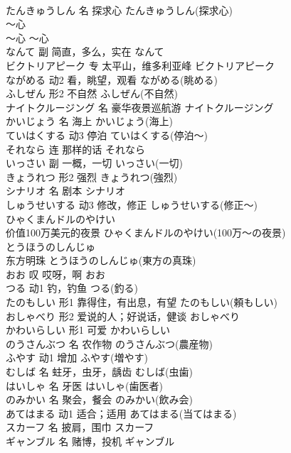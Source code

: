\documentclass[8pt]{extreport}
\begin{document}
\begin{CJK}{UTF8}{min}
\\	たんきゅうしん	名	探求心	たんきゅうしん(探求心)	
\\	～心	
\\	～心	～心	
\\	なんて	副	简直，多么，实在	なんて	
\\	ビクトリアピーク	专	太平山，维多利亚峰	ビクトリアピーク	
\\	ながめる	动2	看，眺望，观看	ながめる(眺める)	
\\	ふしぜん	形2	不自然	ふしぜん(不自然)	
\\	ナイトクルージング	名	豪华夜景巡航游	ナイトクルージング	
\\	かいじょう	名	海上	かいじょう(海上)	
\\	ていはくする	动3	停泊	ていはくする(停泊～)	
\\	それなら	连	那样的话	それなら	
\\	いっさい	副	一概，一切	いっさい(一切)	
\\	きょうれつ	形2	强烈	きょうれつ(強烈)	
\\	シナリオ	名	剧本	シナリオ	
\\	しゅうせいする	动3	修改，修正	しゅうせいする(修正～)	
\\	ひゃくまんドルのやけい	
\\	价值100万美元的夜景	ひゃくまんドルのやけい(100万～の夜景)	
\\	とうほうのしんじゅ	
\\	东方明珠	とうほうのしんじゅ(東方の真珠)	
\\	おお	叹	哎呀，啊	おお	
\\	つる	动1	钓，钓鱼	つる(釣る)	
\\	たのもしい	形1	靠得住，有出息，有望	たのもしい(頼もしい)	
\\	おしゃべり	形2	爱说的人；好说话，健谈	おしゃべり	
\\	かわいらしい	形1	可爱	かわいらしい	
\\	のうさんぶつ	名	农作物	のうさんぶつ(農産物)	
\\	ふやす	动1	增加	ふやす(増やす)	
\\	むしば	名	蛀牙，虫牙，龋齿	むしば(虫歯)	
\\	はいしゃ	名	牙医	はいしゃ(歯医者)	
\\	のみかい	名	聚会，餐会	のみかい(飲み会)	
\\	あてはまる	动1	适合；适用	あてはまる(当てはまる)	
\\	スカーフ	名	披肩，围巾	スカーフ	
\\	ギャンブル	名	赌博，投机	ギャンブル	

\end{CJK}
\end{document}
